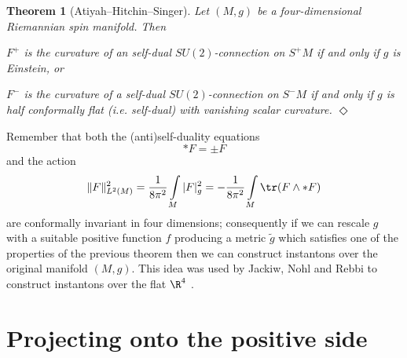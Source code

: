 \documentclass[a4paper,12pt,draft]{article}
\newtheorem{theorem}{Theorem}[section]
\begin{document}
\begin{theorem} [Atiyah--Hitchin--Singer] Let
$(M,g)$ be a four-dimensional Riemannian spin manifold. Then 

 $F^+$ is the curvature of
an self-dual $SU(2)$-connection on $S^+M$ if and only if $g$ is Einstein,
or

 $F^-$ is the curvature of a self-dual
$SU(2)$-connection on $S^-M$ if and only if $g$ is half
conformally flat (i.e. self-dual) with vanishing scalar
curvature. $\Diamond$
\end{theorem}
Remember that both the (anti)self-duality equations
\[*F=\pm F\]
and the action
\[\Vert F\Vert^2_{L^2(M)}={1\over 8\pi^2}\int\limits_M\vert
F\vert^2_g=-{1\over 8\pi^2}\int\limits_M\tr (F\wedge *F)\]
are conformally invariant in four dimensions; consequently if we can
rescale $g$ with a suitable positive function $f$ producing a metric
$\tilde g$ which satisfies one of the properties of the previous theorem
then we can construct instantons over the original manifold $(M,g)$. This
idea was used by Jackiw, Nohl and Rebbi to construct instantons over the
flat $\R^4$ \cite{jac-noh-reb}. 

\section{Projecting onto the positive side}
\end{document}
